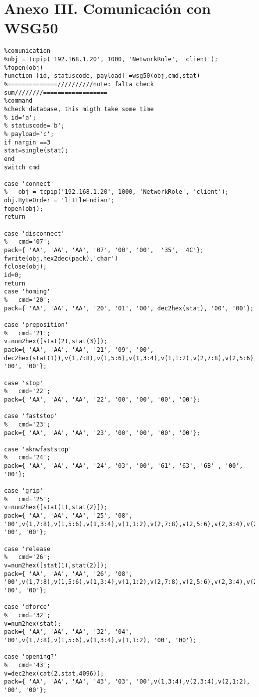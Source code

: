 \section{Anexo III. Comunicación con WSG50}\label{codewsg50}
\begin{lstlisting}
%comunication
%obj = tcpip('192.168.1.20', 1000, 'NetworkRole', 'client');
%fopen(obj)
function [id, statuscode, payload] =wsg50(obj,cmd,stat)
%==============//////////note: falta check sum////////==================
%command
%check database, this migth take some time
% id='a';
% statuscode='b'; 
% payload='c';
if nargin ==3
stat=single(stat);
end
switch cmd

case 'connect'
%   obj = tcpip('192.168.1.20', 1000, 'NetworkRole', 'client');
obj.ByteOrder = 'littleEndian';
fopen(obj);
return

case 'disconnect'
%   cmd='07';
pack={ 'AA', 'AA', 'AA', '07', '00', '00',  '35', '4C'};
fwrite(obj,hex2dec(pack),'char')
fclose(obj);
id=0;
return
case 'homing'
%   cmd='20';
pack={ 'AA', 'AA', 'AA', '20', '01', '00', dec2hex(stat), '00', '00'};

case 'preposition'
%   cmd='21';
v=num2hex([stat(2),stat(3)]);
pack={ 'AA', 'AA', 'AA', '21', '09', '00', dec2hex(stat(1)),v(1,7:8),v(1,5:6),v(1,3:4),v(1,1:2),v(2,7:8),v(2,5:6),v(2,3:4),v(2,1:2), '00', '00'};

case 'stop'
%   cmd='22';
pack={ 'AA', 'AA', 'AA', '22', '00', '00', '00', '00'};

case 'faststop'
%   cmd='23';
pack={ 'AA', 'AA', 'AA', '23', '00', '00', '00', '00'};

case 'aknwfaststop'
%   cmd='24';
pack={ 'AA', 'AA', 'AA', '24', '03', '00', '61', '63', '6B' , '00', '00'};

case 'grip'
%   cmd='25';
v=num2hex([stat(1),stat(2)]);
pack={ 'AA', 'AA', 'AA', '25', '08', '00',v(1,7:8),v(1,5:6),v(1,3:4),v(1,1:2),v(2,7:8),v(2,5:6),v(2,3:4),v(2,1:2), '00', '00'};

case 'release'
%   cmd='26';
v=num2hex([stat(1),stat(2)]);
pack={ 'AA', 'AA', 'AA', '26', '08', '00',v(1,7:8),v(1,5:6),v(1,3:4),v(1,1:2),v(2,7:8),v(2,5:6),v(2,3:4),v(2,1:2), '00', '00'};

case 'dforce'
%   cmd='32';
v=num2hex(stat);
pack={ 'AA', 'AA', 'AA', '32', '04', '00',v(1,7:8),v(1,5:6),v(1,3:4),v(1,1:2), '00', '00'};

case 'opening?'
%   cmd='43';
v=dec2hex(cat(2,stat,4096));
pack={ 'AA', 'AA', 'AA', '43', '03', '00',v(1,3:4),v(2,3:4),v(2,1:2), '00', '00'};


\end{lstlisting}

